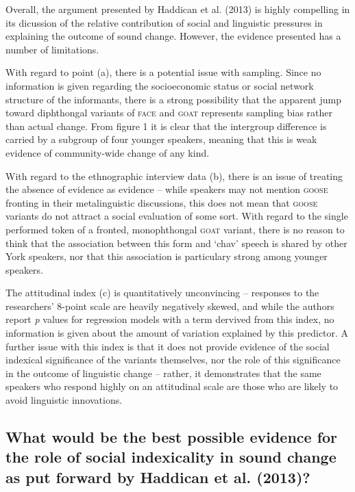 \documentclass{article}
\begin{document}
Overall, the argument presented by Haddican et al. (2013) is highly compelling in its dicussion of the relative contribution of social and linguistic pressures in explaining the outcome of sound change. However, the evidence presented has a number of limitations. 

With regard to point (a), there is a potential issue with sampling. Since no information is given regarding the socioeconomic status or social network structure of the informants, there is a strong possibility that the apparent jump toward diphthongal variants of \textsc{face} and \textsc{goat} represents sampling bias rather than actual change. From figure 1 it is clear that the intergroup difference is carried by a subgroup of four younger speakers, meaning that this is weak evidence of community-wide change of any kind. 

With regard to the ethnographic interview data (b), there is an issue of treating the absence of evidence as evidence -- while speakers may not mention \textsc{goose} fronting in their metalinguistic discussions, this does not mean that \textsc{goose} variants do not attract a social evaluation of some sort. With regard to the single performed token of a fronted, monophthongal \textsc{goat} variant, there is no reason to think that the association between this form and `chav' speech is shared by other York speakers, nor that this association is particulary strong among younger speakers. 

The attitudinal index (c) is quantitatively unconvincing -- responses to the researchers' 8-point scale are heavily negatively skewed, and while the authors report \textit{p} values for regression models with a term dervived from this index, no information is given about the amount of variation explained by this predictor. A further issue with this index is that it does not provide evidence of the social indexical significance of the variants themselves, nor the role of this significance in the outcome of linguistic change -- rather, it demonstrates that the same speakers who respond highly on an attitudinal scale are those who are likely to avoid linguistic innovations. %
\newpage
\subsection*{What would be the best possible evidence for the role of social indexicality in sound change as put forward by Haddican et al. (2013)?}
\end{document}
